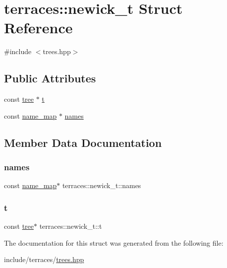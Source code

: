 \hypertarget{structterraces_1_1newick__t}{}\section{terraces\+:\+:newick\+\_\+t Struct Reference}
\label{structterraces_1_1newick__t}


{\ttfamily \#include $<$trees.\+hpp$>$}

\subsection*{Public Attributes}
\begin{DoxyCompactItemize}
\item 
const \hyperlink{namespaceterraces_a07aaf7feec4a22c6cdefc14c5a81bdd0}{tree} $\ast$ \hyperlink{structterraces_1_1newick__t_a9e9b0942b9657ff7e7a603bfeb452432}{t}
\item 
const \hyperlink{namespaceterraces_a4ef0217fe5aed881737d9bc5a8d45dca}{name\+\_\+map} $\ast$ \hyperlink{structterraces_1_1newick__t_a4f0cfb9c109c6677296a6af0238bc134}{names}
\end{DoxyCompactItemize}


\subsection{Member Data Documentation}
\mbox{\label{structterraces_1_1newick__t_a4f0cfb9c109c6677296a6af0238bc134}} 
\subsubsection{\texorpdfstring{names}{names}}
{\footnotesize\ttfamily const \hyperlink{namespaceterraces_a4ef0217fe5aed881737d9bc5a8d45dca}{name\+\_\+map}$\ast$ terraces\+::newick\+\_\+t\+::names}

\mbox{\label{structterraces_1_1newick__t_a9e9b0942b9657ff7e7a603bfeb452432}} 
\subsubsection{\texorpdfstring{t}{t}}
{\footnotesize\ttfamily const \hyperlink{namespaceterraces_a07aaf7feec4a22c6cdefc14c5a81bdd0}{tree}$\ast$ terraces\+::newick\+\_\+t\+::t}



The documentation for this struct was generated from the following file\+:\begin{DoxyCompactItemize}
\item 
include/terraces/\hyperlink{trees_8hpp}{trees.\+hpp}\end{DoxyCompactItemize}
